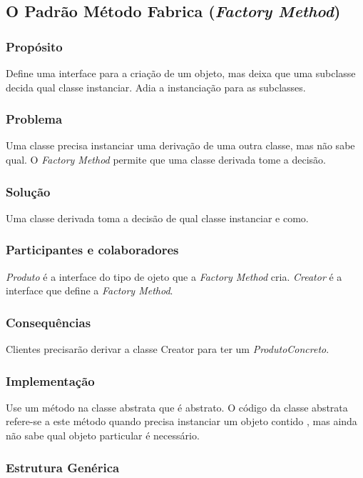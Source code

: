 \documentclass[
	11pt,				%
	openright,
	twoside,			%
	a4paper,			%
	english,			%
	french,
	brazil,				%
	sumario=tradicional
	]{abntex2}
\begin{document}
\subsection{O Padrão Método Fabrica (\textit{Factory Method})}
\subsubsection{Propósito}
Define uma interface para a criação de um objeto, mas deixa que uma subclasse decida qual classe instanciar. Adia a instanciação para as subclasses.

\subsubsection{Problema}
Uma classe precisa instanciar uma derivação de uma outra classe, mas não sabe qual. O \emph{Factory Method} permite que uma classe derivada tome a decisão.

\subsubsection{Solução}
Uma classe derivada toma a decisão de qual classe instanciar e como.

\subsubsection{Participantes e colaboradores}
\emph{Produto} é a interface do tipo de ojeto que a \emph{Factory Method} cria. \emph{Creator} é a interface que define a \emph{Factory Method}.

\subsubsection{Consequências}
Clientes precisarão derivar a classe Creator para ter um \emph{ProdutoConcreto}.

\subsubsection{Implementação}
Use um método na classe abstrata que é abstrato. O código da classe abstrata refere-se a este método quando precisa instanciar um objeto contido , mas ainda não sabe qual objeto particular é necessário.

\subsubsection{Estrutura Genérica}
\end{document}
